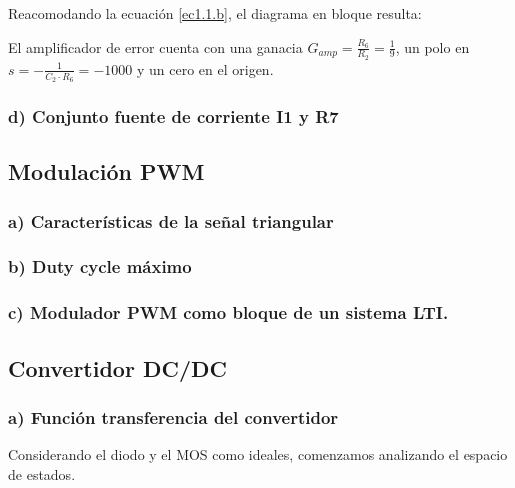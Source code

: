 \documentclass[e4_tp2_main.tex]{subfiles}
\begin{document}
Reacomodando la ecuaci\'on \eqref{ec1.1.b}, el diagrama en bloque resulta: 

\begin{center}
\end{center}


El amplificador de error cuenta con una ganacia $G_{amp}=\frac{R_6}{R_2} =\frac{1}{9}$, un polo en $s=-\frac{1}{C_2 \cdot R_6 }=-1000$ y un cero en el origen.


\subsubsection*{d) Conjunto fuente de corriente I1 y R7}


\subsection{Modulaci\'on PWM}

\subsubsection*{a) Caracter\'isticas de la se\~nal triangular}
\subsubsection*{b) Duty cycle m\'aximo}
\subsubsection*{c) Modulador PWM como bloque de un sistema LTI.}



\subsection{Convertidor DC/DC}
\subsubsection*{a) Funci\'on transferencia del convertidor}

Considerando el diodo y el MOS como ideales, comenzamos analizando el espacio de estados. 
\end{document}

